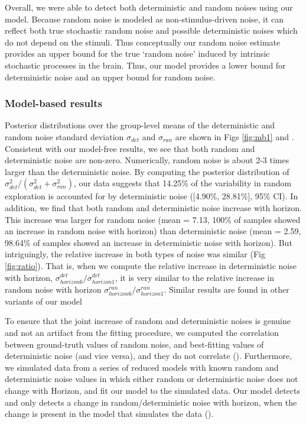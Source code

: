 \documentclass[12pt]{article}
\begin{document}
{Overall, we were able to detect both deterministic and random noises using our model. Because random noise is modeled as non-stimulus-driven noise, it can reflect both true stochastic random noise and possible deterministic noises which do not depend on the stimuli. Thus conceptually our random noise estimate provides an upper bound for the true `random noise' induced by intrinsic stochastic processes in the brain. Thus, our model provides a lower bound for deterministic noise and an upper bound for random noise. 

\subsubsection*{Model-based results} 
Posterior distributions over the group-level means of the deterministic and random noise standard deviation $\sigma_{det}$ and $\sigma_{ran}$ are shown in Figs \ref{fig:mb1} and . Consistent with our model-free results, we see that both random and deterministic noise are non-zero. Numerically, random noise is about 2-3 times larger than the deterministic noise. By computing the posterior distribution of $\sigma^2_{det}/(\sigma^2_{det}+\sigma^2_{ran})$, our data suggests that 14.25\% of the variability in random exploration is accounted for by deterministic noise ([4.90\%, 28.81\%], 95\% CI). In addition, we find that both random and deterministic noise increase with horizon. This increase was larger for random noise (mean = 7.13, 100\% of samples showed an increase in random noise with horizon) than deterministic noise (mean = 2.59, 98.64\% of samples showed an increase in deterministic noise with horizon). But intriguingly, the relative increase in both types of noise was similar (Fig \ref{fig:ratio}). That is, when we compute the relative increase in deterministic noise with horizon, $\sigma^{det}_{horizon6}/\sigma^{det}_{horizon1}$, it is very similar to the relative increase in random noise with horizon $\sigma^{ran}_{horizon6}/\sigma^{ran}_{horizon1}$. Similar results are found in other variants of our model 

To ensure that the joint increase of random and deterministic noises is genuine and not an artifact from the fitting procedure, we computed the correlation between ground-truth values of random noise, and best-fitting values of deterministic noise (and vice versa), and they do not correlate (). Furthermore, we simulated data from a series of reduced models with known random and deterministic noise values in which either random or deterministic noise does not change with Horizon, and fit our model to the simulated data. Our model detects and only detects a change in random/deterministic noise with horizon, when the change is present in the model that simulates the data ().

}
\end{document}
